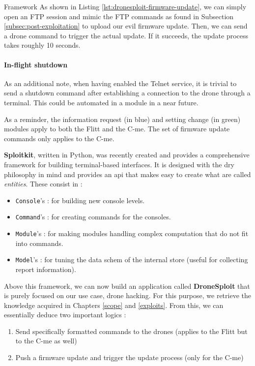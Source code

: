 \begin{chaptercover}{Framework}
As shown in Listing \ref{lst:dronesploit-firmware-update}, we can simply open an FTP session and mimic the FTP commands as found in Subsection \ref{subsec:post-exploitation} to upload our evil firmware update. Then, we can send a drone command to trigger the actual update. If it succeeds, the update process takes roughly 10 seconds.

\paragraph{In-flight shutdown} As an additional note, when having enabled the Telnet service, it is trivial to send a shutdown command after establishing a connection to the drone through a terminal. This could be automated in a module in a near future.

\begin{tip}
As a reminder, the information request (in blue) and setting change (in green) modules apply to both the Flitt and the C-me. The set of firmware update commands only applies to the C-me.
\end{tip}

\begin{summary}
\textbf{Sploitkit}, written in Python, was recently created and provides a comprehensive framework for building terminal-based interfaces. It is designed with the \acrshort{dry} philosophy in mind and provides an \acrshort{api} that makes easy to create what are called \textit{entities}. These consist in :
\begin{itemize}
  \item \texttt{Console}'s : for building new console levels.
  \item \texttt{Command}'s : for creating commands for the consoles.
  \item \texttt{Module}'s : for making modules handling complex computation that do not fit into commands. 
  \item \texttt{Model}'s : for tuning the data schem of the internal store (useful for collecting report information).
\end{itemize}

Above this framework, we can now build an application called \textbf{DroneSploit} that is purely focused on our use case, drone hacking. For this purpose, we retrieve the knowledge acquired in Chapters \ref{scope} and \ref{exploits}. From this, we can essentially deduce two important logics :
\begin{enumerate}
  \item Send specifically formatted commands to the drones \newline (applies to the Flitt but to the C-me as well)
  \item Push a firmware update and trigger the update process \newline (only for the C-me)
\end{enumerate}


\end{summary}
\end{chaptercover}
